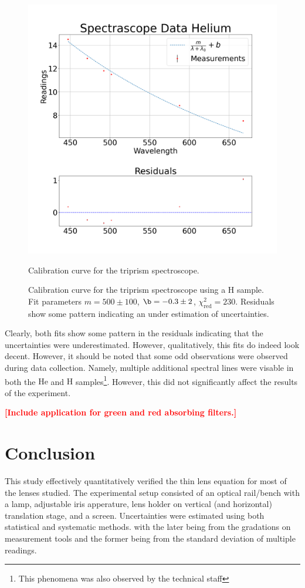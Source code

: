 \documentclass[aip, cp, amsmath, amssymb, reprint, nofootinbib]{revtex4-2}
\begin{document}
            \begin{figure}[H]
                \centering
                \includegraphics[width=0.9\linewidth]{figures/spec-he.png}
                \caption{Calibration curve for the triprism spectroscope.}
                \label{fig:chromatic-H}
                \caption{Calibration curve for the triprism spectroscope using a $\text{H}$ sample. Fit parameters $m = 500\pm100$, $\b=-0.3\pm 2$, $\chi^2_{\text{red}} = 230$. Residuals show some pattern indicating an under estimation of uncertainties.}
                \label{fig:chromatic-H}
            \end{figure}

            Clearly, both fits show some pattern in the residuals indicating that the uncertainties were underestimated. However, qualitatively, this fits do indeed look decent. However, it should be noted that some odd observations were observed during data collection. Namely, multiple additional spectral lines were visable in both the $\text{He}$ and $\text{H}$ samples\footnote{This phenomena was also observed by the technical staff}. However, this did not significantly affect the results of the experiment. 

            \textcolor{red}{\textbf{[Include application for green and red absorbing filters.]}}

    
    \section{Conclusion}
        This study effectively quantitatively verified the thin lens equation for most of the lenses studied. The experimental setup consisted of an optical rail/bench with a lamp, adjustable iris apperature, lens holder on vertical (and horizontal) translation stage, and a screen. Uncertainties were estimated using both statistical and systematic methods. with the later being from the gradations on measurement tools and the former being from the standard deviation of multiple readings.
        
\end{document}
